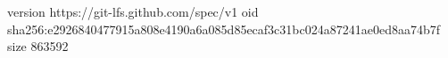 version https://git-lfs.github.com/spec/v1
oid sha256:e2926840477915a808e4190a6a085d85ecaf3c31bc024a87241ae0ed8aa74b7f
size 863592
